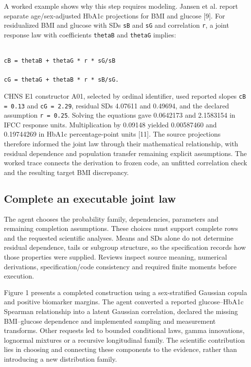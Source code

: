 \documentclass[sigconf,review]{acmart}
\begin{document}
A worked example shows why this step requires modeling. Jansen et al. report separate age/\allowbreak{}sex-adjusted HbA1c projections for BMI and glucose [9]. For residualized BMI and glucose with SDs \texttt{sB} and \texttt{sG} and correlation \texttt{r}, a joint response law with coefficients \texttt{thetaB} and \texttt{thetaG} implies:


\noindent\begin{minipage}{\columnwidth}

\begin{lstlisting}

cB = thetaB + thetaG * r * sG/sB

cG = thetaG + thetaB * r * sB/sG.

\end{lstlisting}

\end{minipage}

CHNS E1 constructor A01, selected by ordinal identifier, used reported slopes \texttt{cB = 0.13} and \texttt{cG = 2.29}, residual SDs 4.07611 and 0.49694, and the declared assumption \texttt{r = 0.25}. Solving the equations gave 0.0642173 and 2.1583154 in IFCC response units. Multiplication by 0.09148 yielded 0.00587460 and 0.19744269 in HbA1c percentage-point units [11]. The source projections therefore informed the joint law through their mathematical relationship, with residual dependence and population transfer remaining explicit assumptions. The worked trace connects the derivation to frozen code, an unfitted correlation check and the resulting target BMI discrepancy.


\subsection{Complete an executable joint law}

The agent chooses the probability family, dependencies, parameters and remaining completion assumptions. These choices must support complete rows and the requested scientific analyses. Means and SDs alone do not determine residual dependence, tails or subgroup structure, so the specification records how those properties were supplied. Reviews inspect source meaning, numerical derivations, specification/\allowbreak{}code consistency and required finite moments before execution.


Figure 1 presents a completed construction using a sex-stratified Gaussian copula and positive biomarker margins. The agent converted a reported glucose–\allowbreak{}HbA1c Spearman relationship into a latent Gaussian correlation, declared the missing BMI–\allowbreak{}glucose dependence and implemented sampling and measurement transforms. Other requests led to bounded conditional laws, gamma innovations, lognormal mixtures or a recursive longitudinal family. The scientific contribution lies in choosing and connecting these components to the evidence, rather than introducing a new distribution family.
\end{document}
